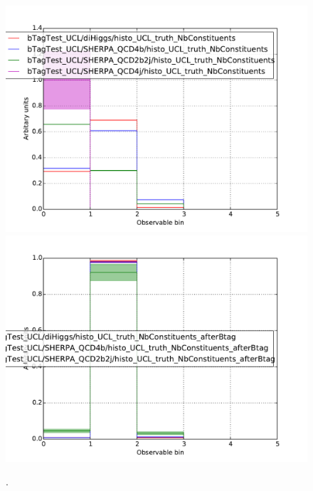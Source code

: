 \documentclass[12pt]{article}
\begin{document}
\begin{figure}[h!]
\begin{center}
\includegraphics[width=\textwidth]{plots/histo_NbConstits_UCL.pdf}
\includegraphics[width=\textwidth]{plots/histo_NbConstits_UCL_afterBtag.pdf}
\caption{.}
\end{center}
\end{figure}
\end{document}
